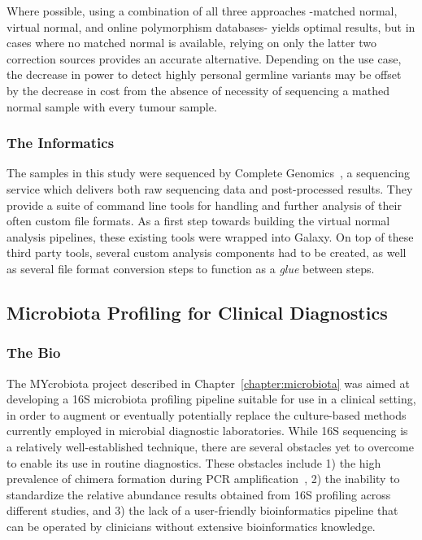 Where possible, using a combination of all three approaches -matched normal, virtual normal, and online polymorphism databases- yields optimal results, but in cases where no matched normal is available, relying on only the latter two correction sources provides an accurate alternative. Depending on the use case, the decrease in power to detect highly personal germline variants may be offset by the decrease in cost from the absence of necessity of sequencing a mathed normal sample with every tumour sample.

\subsubsection{The Informatics}
The samples in this study were sequenced by Complete Genomics~\cite{TODO}, a sequencing service which delivers both raw sequencing data and post-processed results. They provide a suite of command line tools for handling and further analysis of their often custom file formats. As a first step towards building the virtual normal analysis pipelines, these existing tools were wrapped into Galaxy. On top of these third party tools, several custom analysis components had to be created, as well as several file format conversion steps to function as a \emph{glue} between steps.


\subsection{Microbiota Profiling for Clinical Diagnostics}
\subsubsection{The Bio}
The MYcrobiota project described in Chapter~\ref{chapter:microbiota} was aimed at developing a 16S microbiota profiling pipeline suitable for use in a clinical setting, in order to augment or eventually potentially replace the culture-based methods currently employed in microbial diagnostic laboratories. While 16S sequencing is a relatively well-established technique, there are several obstacles yet to overcome to enable its use in routine diagnostics. These obstacles include 1) the high prevalence of chimera formation during PCR amplification~\cite{huttenhower2012structure}, 2) the inability to standardize the relative abundance results obtained from 16S profiling across different studies, and 3) the lack of a user-friendly bioinformatics pipeline that can be operated by clinicians without extensive bioinformatics knowledge.

